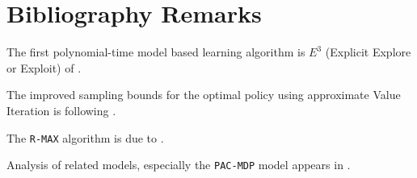 \section{Bibliography Remarks}


The first polynomial-time model based learning algorithm is $E^3$
(Explicit Explore or Exploit) of \cite{KearnsS02}. 

The improved sampling bounds for the optimal policy using
approximate Value Iteration is following \cite{KearnsS98a}.

The {\tt R-MAX} algorithm is due to \cite{BrafmanT02}.

Analysis of related models, especially the {\tt PAC-MDP} model
appears in \cite{StrehlLL09,Li2012}.
